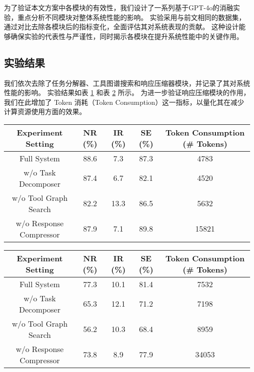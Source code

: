 为了验证本文方案中各模块的有效性，我们设计了一系列基于GPT-4o的消融实验，重点分析不同模块对整体系统性能的影响。
实验采用与前文相同的数据集，通过对比去除各模块后的指标变化，全面评估其对系统表现的贡献。
这种设计能够确保实验的代表性与严谨性，同时揭示各模块在提升系统性能中的关键作用。


\subsection{实验结果}

我们依次去除了任务分解器、工具图谱搜索和响应压缩器模块，并记录了其对系统性能的影响。
实验结果如表 \ref{tab:ablation_simple} 和表 \ref{tab:ablation_hard} 所示。
为进一步验证响应压缩模块的作用，我们在此增加了 Token 消耗（Token Consumption）这一指标，以量化其在减少计算资源使用方面的效果。

\begin{table}[!ht]
  \centering
  \begin{tabular}{c|ccc|c}
  \toprule
  \textbf{Experiment Setting} & NR (\%) & IR (\%) & SE (\%) & \textbf{Token Consumption (\# Tokens)} \\
  \midrule
  Full System                   & 88.6 & 7.3  & 87.3  & 4783 \\
  w/o Task Decomposer           & 87.4 & 6.7  & 82.1  & 4520 \\
  w/o Tool Graph Search         & 82.2 & 13.3 & 86.5  & 5632 \\
  w/o Response Compressor       & 87.9 & 7.1  & 89.8  & 15821 \\
  \bottomrule
  \end{tabular}
  \label{tab:ablation_simple}
\end{table}

\begin{table}[!ht]
  \centering
  \begin{tabular}{c|ccc|c}
  \toprule
  \textbf{Experiment Setting} & NR (\%) & IR (\%) & SE (\%) & \textbf{Token Consumption (\# Tokens)} \\
  \midrule
  Full System                    & 77.3 & 10.1  & 81.4 & 7532 \\
  w/o Task Decomposer            & 65.3 & 12.1  & 71.2 & 7198 \\
  w/o Tool Graph Search          & 56.2 & 10.3  & 68.4 & 8959 \\
  w/o Response Compressor        & 73.8 & 8.9   & 77.9 & 34053 \\
  \bottomrule
  \end{tabular}
  \label{tab:ablation_hard}
\end{table}

